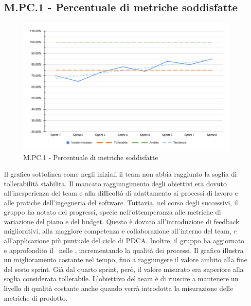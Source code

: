 \subsection{M.PC.1 - Percentuale di metriche soddisfatte}
\begin{figure}[H]
    \centering
    \includegraphics[width=\textwidth]{assets/metriche_soddisfatte.pdf}
    \caption{M.PC.1 - Percentuale di metriche soddisfatte}
\end{figure}

\par Il grafico sottolinea come negli  iniziali il team non abbia raggiunto la soglia di tollerabilità stabilita. Il mancato raggiungimento degli obiettivi era dovuto all’inesperienza del team e alla difficoltà di adattamento ai processi di lavoro e alle pratiche dell’ingegneria del software. Tuttavia, nel corso degli  successivi, il gruppo ha notato dei progressi, specie nell’ottemperanza alle metriche di variazione del piano e del budget. Questo è dovuto all'introduzione di feedback migliorativi, alla maggiore competenza e collaborazione all'interno del team, e all’applicazione più puntuale del ciclo di PDCA. Inoltre, il gruppo ha aggiornato e approfondito il \Wow\ nelle \NdP, incrementando la qualità dei processi. Il grafico illustra un miglioramento costante nel tempo, fino a raggiungere il valore ambito alla fine del sesto sprint. Già dal quarto sprint, però, il valore misurato era superiore alla soglia considerata tollerabile. L’obiettivo del team è di riuscire a mantenere un livello di qualità costante anche quando verrà introdotta la misurazione delle metriche di prodotto.
